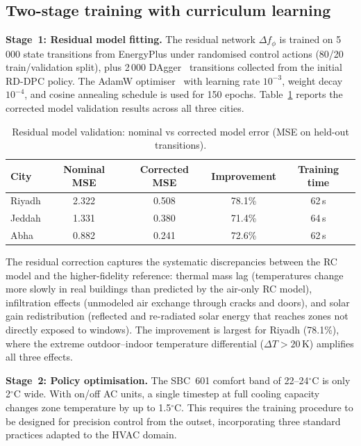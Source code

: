 \documentclass[12pt]{article}
\theoremstyle{plain}
\theoremstyle{definition}
\begin{document}
\subsection{Two-stage training with curriculum learning}\label{sec:training}

\textbf{Stage~1: Residual model fitting.} The residual network $\Delta f_\phi$ is trained on 5\,000 state transitions from EnergyPlus under randomised control actions (80/20 train/validation split), plus 2\,000 DAgger~\cite{ross2011dagger} transitions collected from the initial RD-DPC policy. The AdamW optimiser~\cite{loshchilov2019adamw} with learning rate $10^{-3}$, weight decay $10^{-4}$, and cosine annealing schedule is used for 150 epochs. Table~\ref{tab:residual_val} reports the corrected model validation results across all three cities.

\begin{table}[H]
\centering
\caption{Residual model validation: nominal vs corrected model error (MSE on held-out transitions).}\label{tab:residual_val}
\begin{tabular*}{\textwidth}{@{\extracolsep{\fill}}lcccc}
\toprule
City & Nominal MSE & Corrected MSE & Improvement & Training time \\
\midrule
Riyadh & 2.322 & 0.508 & 78.1\% & 62\,s \\
Jeddah & 1.331 & 0.380 & 71.4\% & 64\,s \\
Abha & 0.882 & 0.241 & 72.6\% & 62\,s \\
\bottomrule
\end{tabular*}
\end{table}

The residual correction captures the systematic discrepancies between the RC model and the higher-fidelity reference: thermal mass lag (temperatures change more slowly in real buildings than predicted by the air-only RC model), infiltration effects (unmodeled air exchange through cracks and doors), and solar gain redistribution (reflected and re-radiated solar energy that reaches zones not directly exposed to windows). The improvement is largest for Riyadh (78.1\%), where the extreme outdoor--indoor temperature differential ($\Delta T > 20$\,K) amplifies all three effects.

\textbf{Stage~2: Policy optimisation.} The SBC~601 comfort band of 22--24$^\circ$C is only 2$^\circ$C wide. With on/off AC units, a single timestep at full cooling capacity changes zone temperature by up to 1.5$^\circ$C. This requires the training procedure to be designed for precision control from the outset, incorporating three standard practices adapted to the HVAC domain.
\end{document}
